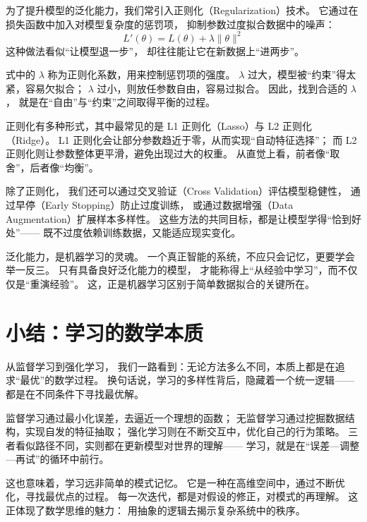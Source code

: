 为了提升模型的泛化能力，我们常引入正则化（Regularization）技术。  
它通过在损失函数中加入对模型复杂度的惩罚项，  
抑制参数过度拟合数据中的噪声：
$$
L'(\theta) = L(\theta) + \lambda \|\theta\|^2
$$  
这种做法看似“让模型退一步”，  
却往往能让它在新数据上“进两步”。



式中的 $\lambda$ 称为正则化系数，用来控制惩罚项的强度。  
$\lambda$ 过大，模型被“约束”得太紧，容易欠拟合；  
$\lambda$ 过小，则放任参数自由，容易过拟合。  
因此，找到合适的 $\lambda$，  
就是在“自由”与“约束”之间取得平衡的过程。



正则化有多种形式，其中最常见的是 L1 正则化（Lasso）与 L2 正则化（Ridge）。  
L1 正则化会让部分参数趋近于零，从而实现“自动特征选择”；  
而 L2 正则化则让参数整体更平滑，避免出现过大的权重。  
从直觉上看，前者像“取舍”，后者像“均衡”。



除了正则化，  
我们还可以通过交叉验证（Cross Validation）评估模型稳健性，  
通过早停（Early Stopping）防止过度训练，  
或通过数据增强（Data Augmentation）扩展样本多样性。  
这些方法的共同目标，都是让模型学得“恰到好处”——  
既不过度依赖训练数据，又能适应现实变化。



泛化能力，是机器学习的灵魂。  
一个真正智能的系统，不应只会记忆，更要学会举一反三。  
只有具备良好泛化能力的模型，  
才能称得上“从经验中学习”，而不仅仅是“重演经验”。  
这，正是机器学习区别于简单数据拟合的关键所在。

\section{小结：学习的数学本质}

从监督学习到强化学习，  
我们一路看到：无论方法多么不同，本质上都是在追求“最优”的数学过程。  
换句话说，学习的多样性背后，隐藏着一个统一逻辑——  
都是在不同条件下寻找最优解。



监督学习通过最小化误差，去逼近一个理想的函数；  
无监督学习通过挖掘数据结构，实现自发的特征抽取；  
强化学习则在不断交互中，优化自己的行为策略。  
三者看似路径不同，实则都在更新模型对世界的理解——  
学习，就是在“误差—调整—再试”的循环中前行。



这也意味着，学习远非简单的模式记忆。  
它是一种在高维空间中，通过不断优化，寻找最优点的过程。  
每一次迭代，都是对假设的修正，对模式的再理解。  
这正体现了数学思维的魅力：  
用抽象的逻辑去揭示复杂系统中的秩序。



